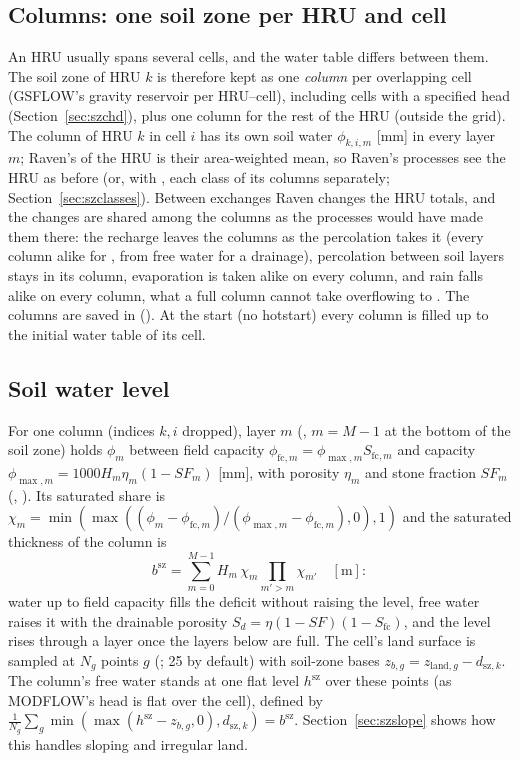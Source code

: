\subsection{Columns: one soil zone per HRU and cell}
An HRU usually spans several cells, and the water table differs between them. The soil zone of HRU $k$ is therefore kept
as one \emph{column} per overlapping cell (GSFLOW's gravity reservoir per HRU--cell), including cells with a specified
head (Section~\ref{sec:szchd}), plus one column for the rest of the HRU (outside the grid). The column of HRU $k$ in cell $i$ has its own soil water $\phi_{k,i,m}$ [mm] in every layer $m$;
Raven's  of the HRU is their area-weighted mean, so Raven's processes see the HRU as before (or, with
, each class of its columns separately; Section~\ref{sec:szclasses}). Between
exchanges Raven changes the HRU totals, and the changes are shared among the columns as the processes would have made
them there: the recharge leaves the columns as the percolation takes it (every column alike for ,
from free water for a drainage), percolation between soil layers stays in its column, evaporation is taken alike on
every column, and rain falls alike on every column, what a full column cannot take overflowing to
. The columns are saved in
 (). At the start (no hotstart) every column is filled up to the initial water
table of its cell.

\subsection{Soil water level}
For one column (indices $k,i$ dropped), layer $m$ (, $m=M-1$ at the bottom of the soil zone) holds $\phi_m$
between field capacity $\phi_{\mathrm{fc},m}=\phi_{\max,m}S_{\mathrm{fc},m}$ and capacity
$\phi_{\max,m}=1000H_m\eta_m(1-\mathit{SF}_m)$ [mm], with porosity $\eta_m$ and stone fraction $\mathit{SF}_m$
(, ). Its saturated share is
$\chi_m=\min(\max((\phi_m-\phi_{\mathrm{fc},m})/(\phi_{\max,m}-\phi_{\mathrm{fc},m}),0),1)$ and the saturated thickness of the
column is
\begin{equation}
b^{\mathrm{sz}}=\sum_{m=0}^{M-1}H_m\,\chi_m\prod_{m'>m}\chi_{m'}\quad[\mathrm m]:
\end{equation}
water up to field capacity fills the deficit without raising the level, free water raises it with the drainable porosity
$S_d=\eta(1-\mathit{SF})(1-S_{\mathrm{fc}})$, and the level rises through a layer once the layers below are full. The cell's land
surface is sampled at $N_g$ points $g$ (; 25 by default) with soil-zone bases
$z_{b,g}=z_{\mathrm{land},g}-d_{\mathrm{sz},k}$. The column's free water stands at one flat level $h^{\mathrm{sz}}$ over these points (as MODFLOW's
head is flat over the cell), defined by $\frac1{N_g}\sum_g\min(\max(h^{\mathrm{sz}}-z_{b,g},0),d_{\mathrm{sz},k})=b^{\mathrm{sz}}$. Section~\ref{sec:szslope} shows how this handles sloping and irregular land.

